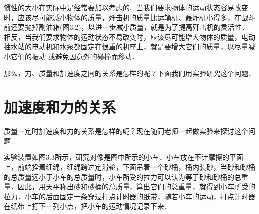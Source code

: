惯性的大小在实际中是经常要加以考虑的．当我们要求物体的运动状态容易改变时，应该尽可能减小物体的质量，歼击机的质量比运输机、轰炸机小得多，在战斗前还要抛掉副油箱(图3.2)，以进一步减小质量，就是为了提高歼击机的灵活性．相反，当我们要求物体的运动状态不易改变时，应该尽可能增大物体的质量，电动抽水站的电动机和水泵都固定在很重的机座上，就是要增大它们的质量，以尽量减小它们的振动
或避免因意外的碰撞而移动．

那么，力、质量和加速度之间的关系是怎样的呢？下面我们用实验研究这个问题．
\newpage

\section{加速度和力的关系}
质量一定时加速度和力的关系是怎样的呢？现在随同老师一起做实验来探讨这个问题．

实验装置如图3.3所示，研究对像是图中所示的小车．小车放在不计摩擦的平面上，前端拴着细绳，细绳跨过定滑轮，下面吊着一个砂桶，桶内装砂，当砂和砂桶的总质量远小于小车的总质量时，小车所受的拉力可以认为等于砂和砂桶的总重量．因此，用天平称出砂和砂桶的总质量，算出它们的总重量，就得到小车所受的拉力．小车的后面固定一条穿过打点计时器的纸带，随若小车的运动，打点计时器在纸带上打下一列小点，把小车的运动情况记录下来．

